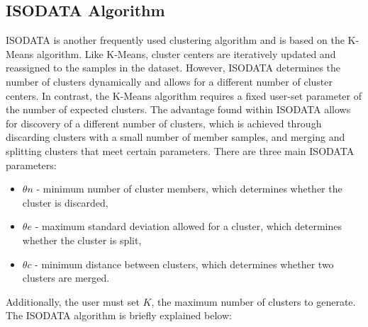 \documentclass[twoside,twocolumn]{article}
\begin{document}

\subsection{ISODATA Algorithm}

ISODATA is another frequently used clustering algorithm and is based on the
K-Means algorithm. Like K-Means, cluster centers are iteratively updated and
reassigned to the samples in the dataset. However, ISODATA determines the number
of clusters dynamically and allows for a different number of cluster centers. In
contrast, the K-Means algorithm requires a fixed user-set parameter of the
number of expected clusters. The advantage found within ISODATA allows for
discovery of a different number of clusters, which is achieved through
discarding clusters with a small number of member samples, and merging and
splitting clusters that meet certain parameters. There are three main ISODATA
parameters:

\begin{itemize}
  \item $\theta n$ - minimum number of cluster members, which determines whether
        the cluster is discarded,
  \item $\theta e$ - maximum standard deviation allowed for a cluster, which
        determines whether the cluster is split,
  \item $\theta c$ - minimum distance between clusters, which determines whether
        two clusters are merged.
\end{itemize}

Additionally, the user must set $K$, the maximum number of clusters to generate.
The ISODATA algorithm is briefly explained below:
\end{document}
